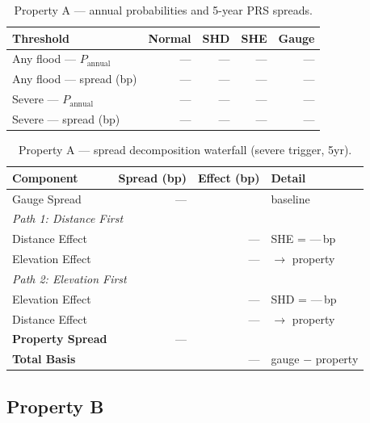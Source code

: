\documentclass[11pt,a4paper]{article}
\begin{document}
\begin{table}[H]
    \centering
    \caption{Property A --- annual probabilities and 5-year PRS spreads.}
    \begin{tabular}{lrrrr}
        \toprule
        \textbf{Threshold} & \textbf{Normal} & \textbf{SHD} & \textbf{SHE} & \textbf{Gauge} \\
        \midrule
        Any flood --- $P_{\text{annual}}$  & --- & --- & --- & --- \\
        Any flood --- spread (bp)          & --- & --- & --- & --- \\
        Severe --- $P_{\text{annual}}$     & --- & --- & --- & --- \\
        Severe --- spread (bp)             & --- & --- & --- & --- \\
        \bottomrule
    \end{tabular}
\end{table}

\begin{table}[H]
    \centering
    \caption{Property A --- spread decomposition waterfall (severe trigger, 5yr).}
    \begin{tabular}{lrrl}
        \toprule
        \textbf{Component} & \textbf{Spread (bp)} & \textbf{Effect (bp)} & \textbf{Detail} \\
        \midrule
        Gauge Spread                  & --- &        & baseline \\
        \multicolumn{4}{l}{\textit{Path 1: Distance First}} \\
        \quad Distance Effect         &     & ---    & SHE = ---\,bp \\
        \quad Elevation Effect        &     & ---    & $\rightarrow$ property \\
        \multicolumn{4}{l}{\textit{Path 2: Elevation First}} \\
        \quad Elevation Effect        &     & ---    & SHD = ---\,bp \\
        \quad Distance Effect         &     & ---    & $\rightarrow$ property \\
        \midrule
        \textbf{Property Spread}      & --- &        & \\
        \textbf{Total Basis}          &     & ---    & gauge $-$ property \\
        \bottomrule
    \end{tabular}
\end{table}


\subsection{Property B}
\end{document}
